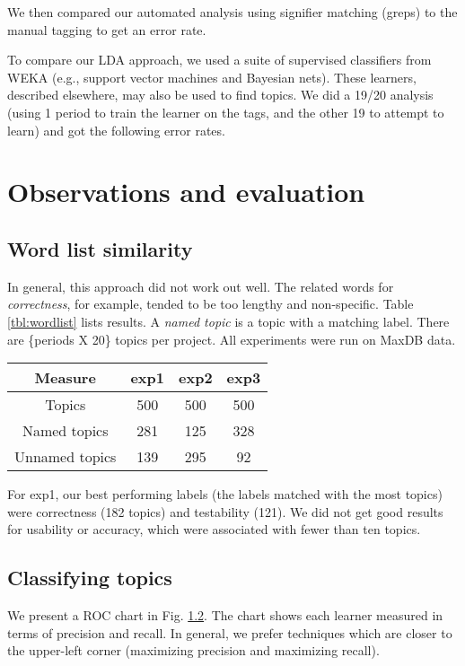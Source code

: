 \documentclass[10pt, conference, compsocconf]{IEEEtran}
\begin{document}
We then compared our automated analysis using signifier matching (greps) to the manual tagging to get an error rate.

To compare our LDA approach, we used a suite of supervised classifiers from WEKA (e.g., support vector machines and Bayesian nets). These learners, described elsewhere, may also be used to find topics. We did a 19/20 analysis (using 1 period to train the learner on the tags, and the other 19 to attempt to learn) and got the following error rates. 

\section{Observations and evaluation}

\subsection{Word list similarity}
In general, this approach did not work out well. The related words for \emph{correctness}, for example, tended to be too lengthy and non-specific. Table \ref{tbl:wordlist} lists results. A \emph{named topic} is a topic with a matching label. There are \{periods X 20\} topics per project. All experiments were run on MaxDB data.

\begin{table*}[h]
	\caption{Results for automatic topic labeling}
	\centering
	\label{tbl:wordlist}
\begin{tabular}{c|c|c|c}
\toprule
Measure &		 \textsf{exp1} &	 \textsf{exp2} &	 \textsf{exp3} \\
\midrule
Topics &			500		 &			500  	 & 		500  \\
Named topics &		281      &			125      &		328  \\
Unnamed topics &	139      &			295      &      92   \\
\bottomrule
\end{tabular}
\end{table*}

For \textsf{exp1}, our best performing labels (the labels matched with the most topics) were correctness (182 topics) and testability (121). We did not get good results for usability or accuracy, which were associated with fewer than ten topics.

\subsection{Classifying topics}
We present a ROC chart in Fig. \ref{}. The chart shows each learner measured in terms of precision and recall. In general, we prefer techniques which are closer to the upper-left corner (maximizing precision and maximizing recall). 
\end{document}
